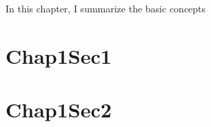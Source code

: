 \minitoc

\vspace{0.5cm}
In this chapter, I summarize the basic concepts 


\section{Chap1Sec1}\label{chap1:sec1}


\section{Chap1Sec2}\label{chap1:sec2}
